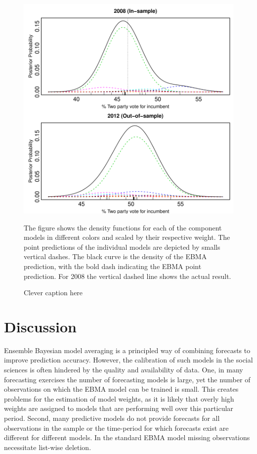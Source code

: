 \documentclass[12pt,fullpage,endnotes]{article}
\begin{document}
\begin{figure}[h]
\caption{Clever caption here}
\label{pres}
\begin{center}
\includegraphics[scale=.8]{presForecast}
\end{center}
The figure shows the density functions for each of the component models in different colors and scaled by their respective weight. The point predictions of the individual models are depicted by smalls vertical dashes. The black curve is the density of the EBMA prediction, with the bold dash indicating the EBMA point prediction. For 2008 the vertical dashed line shows the actual result.
\end{figure}





\section{Discussion} 
Ensemble Bayesian model averaging is a principled way of combining forecasts to improve prediction accuracy. However, the calibration of such models in the social sciences is often hindered by the quality and availability of data. One, in many forecasting exercises the number of forecasting models is large, yet the number of observations on which the EBMA model can be trained is small. This creates problems for the estimation of model weights, as it is likely that overly high weights are assigned to models that are performing well over this particular period. Second, many predictive models do not provide forecasts for all observations in the sample or the time-period for which forecasts exist are different for different models. In the standard EBMA model missing observations necessitate list-wise deletion. 
\end{document}
